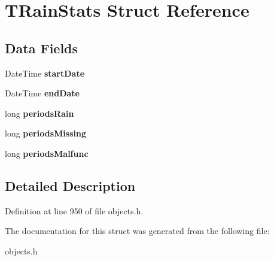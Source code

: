 \hypertarget{struct_t_rain_stats}{}\section{T\+Rain\+Stats Struct Reference}
\label{struct_t_rain_stats}
\subsection*{Data Fields}
\begin{DoxyCompactItemize}
\item 
\mbox{\label{struct_t_rain_stats_a601669853ae03e35b04c3f9111523337}} 
Date\+Time {\bfseries start\+Date}
\item 
\mbox{\label{struct_t_rain_stats_a7ec056fdfa389ad7991be6a4022f7287}} 
Date\+Time {\bfseries end\+Date}
\item 
\mbox{\label{struct_t_rain_stats_ac21ffaed1fd82ad949ab4171258f7949}} 
long {\bfseries periods\+Rain}
\item 
\mbox{\label{struct_t_rain_stats_ae2e6d45b77d035c4d2f3758290a59d0c}} 
long {\bfseries periods\+Missing}
\item 
\mbox{\label{struct_t_rain_stats_a0719b4ce4c6c66b6811339d5396bc49d}} 
long {\bfseries periods\+Malfunc}
\end{DoxyCompactItemize}


\subsection{Detailed Description}


Definition at line 950 of file objects.\+h.



The documentation for this struct was generated from the following file\+:\begin{DoxyCompactItemize}
\item 
objects.\+h\end{DoxyCompactItemize}
